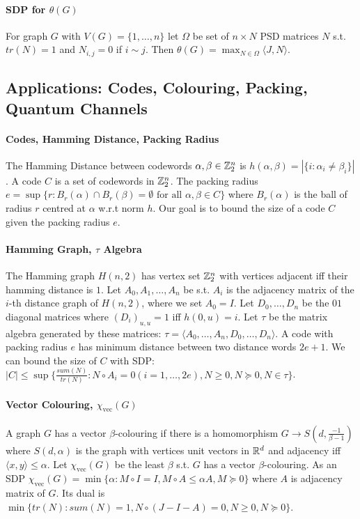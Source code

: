 \documentclass[letterpaper,11pt,oneside,onecolumn]{article}
\begin{document}
\paragraph{SDP for $\theta(G)$} For graph $G$ with $V(G) = \{1,\dots,n\}$ let $\Omega$ be set of $n\times N$ PSD matrices $N$ s.t. $tr(N) = 1$ and $N_{i,j} = 0$ if $i\sim j$. Then $\theta(G) = \max_{N \in \Omega} \langle J, N\rangle$.
\subsection*{Applications: Codes, Colouring, Packing, Quantum Channels}
\paragraph{Codes, Hamming Distance, Packing Radius} The Hamming Distance between codewords $\alpha,\beta \in \mathbb{Z}^n_2$ is $h(\alpha,\beta) = |\{i:\alpha_i \neq \beta_i \}|$. A code $C$ is a set of codewords in $\mathbb{Z}^n_2$. The packing radius $e = \sup \{ r: B_r(\alpha) \cap B_r(\beta) = \emptyset \text{ for all } \alpha,\beta \in C\}$ where $B_r(\alpha)$ is the ball of radius $r$ centred at $\alpha$ w.r.t norm $h$. Our goal is to bound the size of a code $C$ given the packing radius $e$.
\paragraph{Hamming Graph, $\tau$ Algebra} The Hamming graph $H(n,2)$ has vertex set $\mathbb{Z}^n_2$ with vertices adjacent iff their hamming distance is $1$. Let $A_0, A_1, \dots, A_n$ be s.t. $A_i$ is the adjacency matrix of the $i$-th distance graph of $H(n,2)$, where we set $A_0 = I$. Let $D_0,\dots, D_n$ be the $0$$1$ diagonal matrices where $(D_i)_{u,u}= 1$ iff $h(0,u) = i$. Let $\tau$ be the matrix algebra generated by these matrices: $\tau = \langle A_0, \dots, A_n, D_0, \dots, D_n \rangle$. A code with packing radius $e$ has minimum distance between two distance words $2e+1$. We can bound the size of $C$ with SDP: $|C| \leq \sup \{ \frac{sum(N)}{tr(N)} : N \circ A_i = 0 (i = 1, \dots, 2e), N \geq 0, N \succcurlyeq 0, N \in \tau \}$.
\paragraph{Vector Colouring, $\chi_{\text{vec}}(G)$} A graph $G$ has a vector $\beta$-colouring if there is a homomorphism $G \rightarrow S(d, \frac{-1}{\beta -1})$ where $S(d,\alpha)$ is the graph with vertices unit vectors in $\mathbb{R}^d$ and adjacency iff $\langle x, y\rangle \leq \alpha$. Let $\chi_{\text{vec}}(G)$ be the least $\beta$ s.t. $G$ has a vector $\beta$-colouring. As an SDP $\chi_{\text{vec}}(G) = \min\{\alpha: M\circ I = I, M\circ A\leq \alpha A, M \succcurlyeq 0\}$ where $A$ is adjacency matrix of $G$. Its dual is $\min\{tr(N) : sum(N) = 1, N\circ(J-I-A) = 0, N \geq 0, N \succcurlyeq 0\}$.
\end{document}
